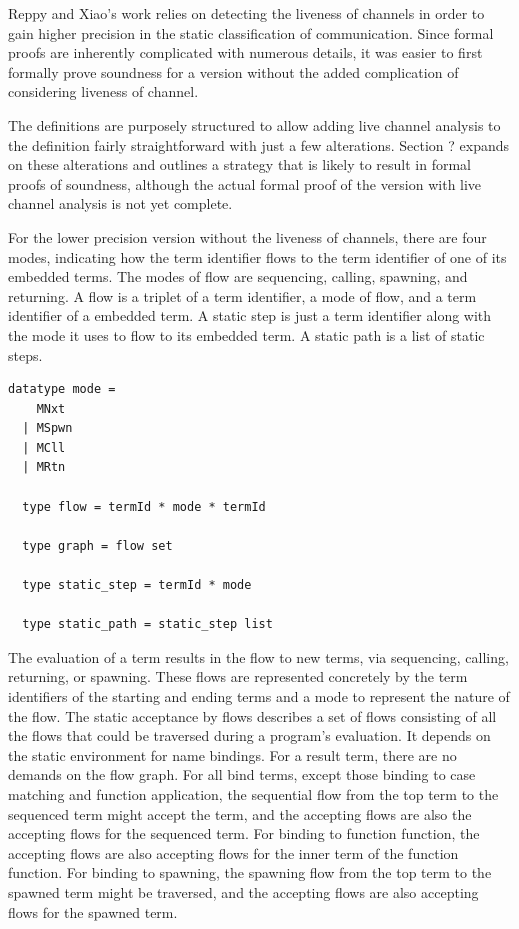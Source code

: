 \documentclass[10pt]{article}
\begin{document}
Reppy and Xiao's work relies on detecting the liveness of channels in order to gain higher
precision in the static classification of communication. Since formal proofs are inherently
complicated with numerous details, it was easier to first formally prove soundness for a
version without the added complication of considering liveness of channel.

The definitions are purposely structured to allow adding live channel analysis to the
definition fairly straightforward with just a few alterations.  Section ? expands on
these alterations and outlines a strategy that is likely to result in formal proofs of
soundness, although the actual formal proof of the version with live channel analysis is
not yet complete.  

For the lower precision version without the liveness of channels, there are four modes,
indicating how the term identifier flows to the term identifier of one of
its embedded terms.
The modes of flow are sequencing, calling, spawning, and returning. A flow is a
triplet of a term identifier, a mode of flow, and a term identifier of a
embedded term. A static step is just a term identifier along with the mode it uses to
flow to its embedded term. A static path is a list of static steps.  

\begin{lstlisting}[language=logic, mathescape]
  datatype mode =
    MNxt
  | MSpwn
  | MCll
  | MRtn

  type flow = termId * mode * termId

  type graph = flow set

  type static_step = termId * mode

  type static_path = static_step list
\end{lstlisting}

The evaluation of a term results in the flow to new terms,
via sequencing, calling, returning, or spawning.  These flows are represented concretely
by the term identifiers of the starting and ending terms and a mode
to represent the nature of the flow.
The static acceptance by flows describes a set of flows consisting of all the flows
that could be traversed during a program's evaluation.
It depends on the static environment for name bindings.
For a result term, there are no demands on the flow graph.  For all bind terms, except those binding
to case matching and function application, the sequential flow from the top term to
the sequenced term might accept the term, and the accepting flows are also the
accepting flows for the sequenced term.  For binding to function function, the
accepting flows are also accepting flows for the inner term of the
function function.  For binding to spawning, the spawning flow from the top term
to the spawned term might be traversed, and the accepting flows are also
accepting flows for the spawned term.
\end{document}
